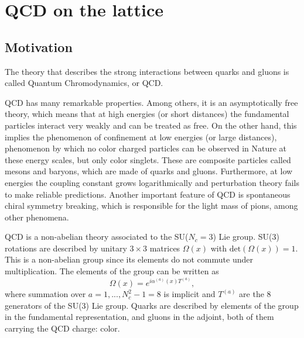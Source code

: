 \chapter{QCD on the lattice}


\label{ch_foundation}


\section{Motivation}
\label{ch_foundation:sec:general}

The theory that describes the strong interactions between quarks and gluons is called Quantum Chromodynamics, or QCD. 

QCD has many remarkable properties. Among others, it is an asymptotically free theory, which means that at high energies (or short distances) the fundamental particles interact very weakly and can be treated as free. On the other hand, this implies the phenomenon of confinement at low energies (or large distances), phenomenon by which no color charged particles can be observed in Nature at these energy scales, but only color singlets. These are composite particles called mesons and baryons, which are made of quarks and gluons. Furthermore, at low energies the coupling constant grows logarithmically and perturbation theory fails to make reliable predictions. Another important feature of QCD is spontaneous chiral symmetry breaking, which is responsible for the light mass of pions, among other phenomena.

QCD is a non-abelian theory associated to the SU($N_c=3$) Lie group. SU(3) rotations are described by unitary $3\times 3$ matrices $\Omega(x)$ with ${\textrm{det}}\left(\Omega(x)\right)=1$. This is a non-abelian group since its elements do not commute under multiplication. The elements of the group can be written as
\begin{equation}
\Omega(x)=e^{i\alpha^{(a)}(x)T^{(a)}},
\end{equation}
where summation over $a=1,...,N_c^2-1=8$ is implicit and $T^{(a)}$ are the 8 generators of the SU(3) Lie group. Quarks are described by elements of the group in the fundamental representation, and gluons in the adjoint, both of them carrying the QCD charge: color.

